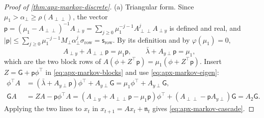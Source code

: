 \begin{proof}[Proof of \cref{thm:apx-markov-discrete}]
(a) Triangular form. Since $\mu_1>\alpha_\perp\ge\rho(A_{\perp\perp})$, the vector $\mathsf p=(\mu_1-A_{\perp\perp})^{-1}A_{\perp y}=\sum_{j\ge0}\mu_1^{-j-1}A_{\perp\perp}^jA_{\perp y}$ is defined and real, and $\lvert\mathsf p\rvert\le\sum_{j\ge0}\mu_1^{-j-1}M_\perp\alpha_\perp^j\sigma_{\mathrm{row}}=\mathsf s_{\mathrm{row}}$. By its definition and by $\varphi(\mu_1)=0$,
\begin{equation}\label{eq:apx-markov-eigen}
A_{\perp y}+A_{\perp\perp}\mathsf p=\mu_1\mathsf p,\qquad\bar\lambda+A_{y\perp}\mathsf p=\mu_1 ,
\end{equation}
which are the two block rows of $A(\phi+Z^\top\mathsf p)=\mu_1(\phi+Z^\top\mathsf p)$. Insert $Z=\mathsf G+\mathsf p\phi^\top$ in \eqref{eq:apx-markov-blocks} and use \eqref{eq:apx-markov-eigen}:
\begin{equation}\label{eq:apx-markov-intertwine}
\begin{aligned}
\phi^\top A&=(\bar\lambda+A_{y\perp}\mathsf p)\phi^\top+A_{y\perp}\mathsf G=\mu_1\phi^\top+A_{y\perp}\mathsf G,\\
\mathsf GA&=ZA-\mathsf p\phi^\top A=(A_{\perp y}+A_{\perp\perp}\mathsf p-\mu_1\mathsf p)\phi^\top+(A_{\perp\perp}-\mathsf pA_{y\perp})\mathsf G=A_2\mathsf G .
\end{aligned}
\end{equation}
Applying the two lines to $x_t$ in $x_{t+1}=Ax_t+\mathfrak n_t$ gives \eqref{eq:apx-markov-cascade}.


\end{proof}
